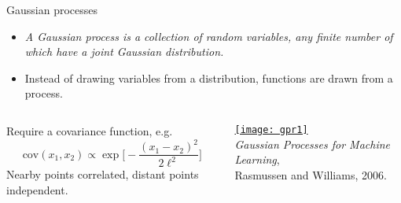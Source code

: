 \documentclass{beamer}
\begin{document}
\begin{frame}[label=gp]{Gaussian processes}


  \begin{itemize}
    \item \emph{A Gaussian process is a collection of random variables, any finite number of which have a joint Gaussian distribution.}
    \item Instead of drawing variables from a distribution, functions are drawn from a process.
  \end{itemize}



  \begin{columns}[c]
    Require a covariance function, e.g.
    \begin{equation*}
      \text{cov}(x_1,x_2) \propto \exp \biggl[ -\frac{(x_1 - x_2)^2}{2\ell^2} \biggr]
    \end{equation*}
    Nearby points correlated, distant points independent.

    \hyperlink{gengp}{\texttt{[image: gpr1]}} \\[1ex]
    \raggedleft\tiny \emph{Gaussian Processes for Machine Learning}, \\ Rasmussen and Williams, 2006.
  \end{columns}

\end{frame}
\end{document}
